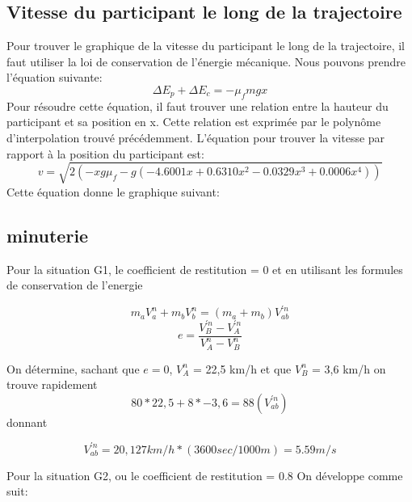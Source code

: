 \documentclass{article}
\begin{document}
\subsection{Vitesse du participant le long de la trajectoire}
Pour trouver le graphique de la vitesse du participant le long de la trajectoire, il faut utiliser la loi de conservation de l'énergie mécanique. Nous pouvons prendre l'équation suivante:
\begin{equation}
	\Delta E_p + \Delta E_c = -\mu_fmgx
\end{equation}
Pour résoudre cette équation, il faut trouver une relation entre la hauteur du participant et sa position en x. Cette relation est exprimée par le polynôme d'interpolation trouvé précédemment. L'équation pour trouver la vitesse par rapport à la position du participant est:
\begin{equation}
	v = \sqrt{2(-xg\mu_f-g(-4.6001x+0.6310x^2-0.0329x^3+0.0006x^4))}
\end{equation}
Cette équation donne le graphique suivant:
\begin{center}
\end{center}

 
 \subsection{minuterie}
 Pour la situation G1, le coefficient de restitution = 0 et
 en utilisant les formules de conservation de l'energie 
 
 \begin{equation}
 m_{a}V_{a}^{n} + m_{b}V_{b}^{n} =( m_{a} + m_{b})V_{ab}^{'n} 
 \end{equation}
 \begin{equation}
 e = \frac {V_{B}^{'n}-V_{A}^{'n}}{V_{A}^{n}-V_{B}^{n}} 
\end{equation}  

 On détermine, sachant que $ e = 0$, $ V_{A}^{n}$ = 22,5 km/h et que  $V_{B}^{n}$ = 3,6 km/h on trouve rapidement
 \begin{equation}
  80*22,5 +8*-3,6 = 88(V_{ab}^{'n})
\end{equation}  
donnant

\begin{equation}
V_{ab}^{'n} = 20,127 km/h * (3600sec/1000m) = 5.59 m/s
\end{equation}


\vspace*{4mm}
 Pour la situation G2, ou le coefficient de restitution = 0.8 On développe comme suit:
\end{document}
